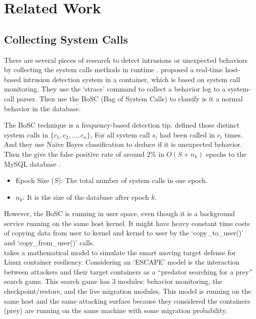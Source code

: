 \section{Related Work}

\subsection{Collecting System Calls}
There are several pieces of research to detect intrusions or unexpected behaviors
by collecting the system calls methods in runtime \cite{10.1007/978-3-319-24858-5_8,9307722,7809699,7796855}.
\textcite{10.1007/978-3-319-24858-5_8} proposed a real-time host-based intrusion
detection system in a container, which is based on system call monitoring. They use
the `strace' command to collect a behavior log to a system-call parser. Then use the
BoSC (Bag of System Calls) \cite{1495942} to classify is it a normal behavior in
the database.

The BoSC technique is a frequency-based detection tip. \textcite{1495942} defined
those distinct system calls in $\{c_1, c_2, \dots, c_n \}$, For all system call $s_i$
had been called in $c_i$ times. And they use Na\"ive Bayes classification to deduce if
it is unexpected behavior. Then the \citeauthor{10.1007/978-3-319-24858-5_8} give the false positive rate
of around 2\% in $O(S+n_k)$ epochs to the MySQL database \cite{10.1007/978-3-319-24858-5_8}.
\begin{itemize}
    \item Epoch Size ($S$): The total number of system calls in one epoch.
    \item $n_k$: It is the size of the database after epoch $k$.
\end{itemize}
However, the BoSC is running in user space, even though it is a background service running
on the same host kernel. It might have heavy constant time costs of copying data from
user to kernel and kernel to user by the `copy\_to\_user()' and `copy\_from\_user()' calls.\\

\textcite{7809699,7796855} takes a mathematical model to simulate the
smart moving target defense for Linux container resiliency. Considering an `ESCAPE' model
is the interaction between attackers and their target containers as a “predator searching
for a prey” search game. This search game has 3 modules: behavior monitoring, the
checkpoint/restore, and the live migration modules.
This model is running on the same host and the same attacking surface because they considered
the containers (prey) are running on the same machine with some migration probability.

